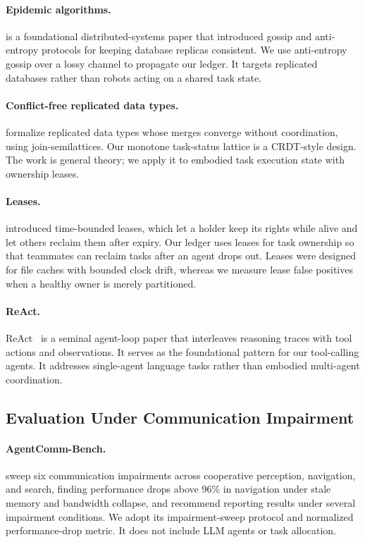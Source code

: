 \documentclass[letterpaper]{article}
\begin{document}
\paragraph{Epidemic algorithms.}
\citet{demers1987epidemic} is a foundational distributed-systems paper that introduced gossip and anti-entropy protocols for keeping database replicas consistent. We use anti-entropy gossip over a lossy channel to propagate our ledger. It targets replicated databases rather than robots acting on a shared task state.

\paragraph{Conflict-free replicated data types.}
\citet{shapiro2011crdt} formalize replicated data types whose merges converge without coordination, using join-semilattices. Our monotone task-status lattice is a CRDT-style design. The work is general theory; we apply it to embodied task execution state with ownership leases.

\paragraph{Leases.}
\citet{gray1989leases} introduced time-bounded leases, which let a holder keep its rights while alive and let others reclaim them after expiry. Our ledger uses leases for task ownership so that teammates can reclaim tasks after an agent drops out. Leases were designed for file caches with bounded clock drift, whereas we measure lease false positives when a healthy owner is merely partitioned.

\paragraph{ReAct.}
ReAct~\citep{yao2023react} is a seminal agent-loop paper that interleaves reasoning traces with tool actions and observations. It serves as the foundational pattern for our tool-calling agents. It addresses single-agent language tasks rather than embodied multi-agent coordination.

\subsection{Evaluation Under Communication Impairment}

\paragraph{AgentComm-Bench.}
\citet{bansal2026agentcomm} sweep six communication impairments across cooperative perception, navigation, and search, finding performance drops above 96\% in navigation under stale memory and bandwidth collapse, and recommend reporting results under several impairment conditions. We adopt its impairment-sweep protocol and normalized performance-drop metric. It does not include LLM agents or task allocation.
\end{document}
